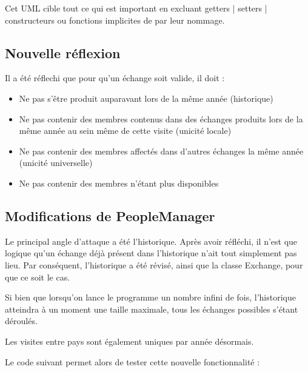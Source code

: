 \documentclass{mytex}
\begin{document}
Cet UML cible tout ce qui est important en excluant getters | setters | constructeurs ou fonctions implicites de par leur nommage.


\subsection{Nouvelle réflexion}

Il a été réflechi que pour qu'un échange soit valide, il doit :

\begin{itemize}
	\item Ne pas s'être produit auparavant lors de la même année (historique)
	\item Ne pas contenir des membres contenus dans des échanges produits lors de la même année au sein même de cette visite (unicité locale)
	\item Ne pas contenir des membres affectés dans d'autres échanges la même année (unicité universelle)
	\item Ne pas contenir des membres n'étant plus disponibles
\end{itemize}

\subsection{Modifications de PeopleManager}

Le principal angle d'attaque a été l'historique.
Après avoir réfléchi, il n'est que logique qu'un échange déjà présent dans l'historique n'ait tout simplement pas lieu.
Par conséquent, l'historique a été révisé, ainsi que la classe Exchange, pour que ce soit le cas.

Si bien que lorsqu'on lance le programme un nombre infini de fois, l'historique atteindra à un moment une taille maximale, tous les échanges possibles s'étant déroulés.

Les visites entre pays sont également uniques par année désormais.

Le code suivant permet alors de tester cette nouvelle fonctionnalité :
\end{document}
